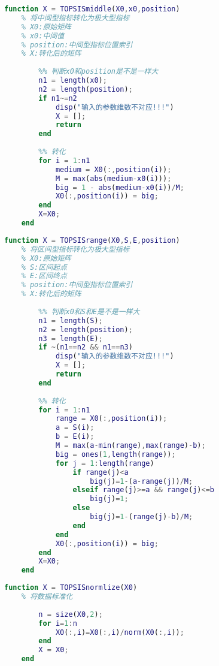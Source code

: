 \documentclass[withoutpreface]{cumcmthesis}
\begin{document}
    \begin{lstlisting}[language=matlab,caption={TOPSISmiddle.m}]
    function X = TOPSISmiddle(X0,x0,position)
    % 将中间型指标转化为极大型指标
    % X0:原始矩阵
    % x0:中间值
    % position:中间型指标位置索引
    % X:转化后的矩阵
    
        %% 判断x0和position是不是一样大
        n1 = length(x0);
        n2 = length(position);
        if n1~=n2
            disp("输入的参数维数不对应!!!")
            X = [];
            return 
        end
        
        %% 转化
        for i = 1:n1
            medium = X0(:,position(i));
            M = max(abs(medium-x0(i)));
            big = 1 - abs(medium-x0(i))/M;
            X0(:,position(i)) = big;
        end
        X=X0;
    end
    \end{lstlisting}

    \begin{lstlisting}[language=matlab,caption={TOPSISrange.m}]
    function X = TOPSISrange(X0,S,E,position)
    % 将区间型指标转化为极大型指标
    % X0:原始矩阵
    % S:区间起点
    % E:区间终点
    % position:中间型指标位置索引
    % X:转化后的矩阵
    
        %% 判断x0和S和E是不是一样大
        n1 = length(S);
        n2 = length(position);
        n3 = length(E);
        if ~(n1==n2 && n1==n3)
            disp("输入的参数维数不对应!!!")
            X = [];
            return 
        end
        
        %% 转化
        for i = 1:n1
            range = X0(:,position(i));
            a = S(i);
            b = E(i);
            M = max(a-min(range),max(range)-b);
            big = ones(1,length(range));
            for j = 1:length(range)
                if range(j)<a
                    big(j)=1-(a-range(j))/M;
                elseif range(j)>=a && range(j)<=b
                    big(j)=1;
                else
                    big(j)=1-(range(j)-b)/M;
                end
            end
            X0(:,position(i)) = big;
        end
        X=X0;
    end
    \end{lstlisting}

    \begin{lstlisting}[language=matlab,caption={TOPSISnormlize.m}]
    function X = TOPSISnormlize(X0)
    % 将数据标准化
    
        n = size(X0,2);
        for i=1:n
            X0(:,i)=X0(:,i)/norm(X0(:,i));
        end
        X = X0;
    end        
    \end{lstlisting}
\end{document}
